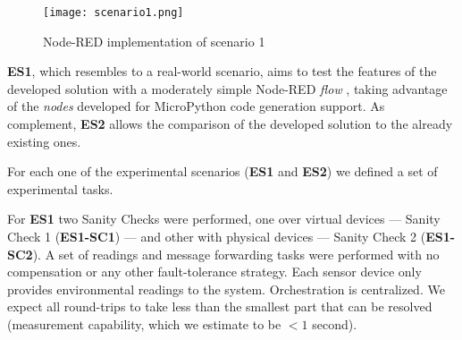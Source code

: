 \begin{figure}[h]
\centering
\texttt{[image: scenario1.png]}
\caption[Node-RED implementation of scenario 1]{Node-RED implementation of scenario 1}\label{fig:scenario1_node_red}
\end{figure}

\textbf{ES1}, which resembles to a real-world scenario, aims to test the features of the developed solution with a moderately simple Node-RED \textit{flow} , taking advantage of the \textit{nodes} developed for MicroPython code generation support. As complement, \textbf{ES2} allows the comparison of the developed solution to the already existing ones.

For each one of the experimental scenarios (\ie \textbf{ES1} and \textbf{ES2}) we defined a set of experimental tasks. 

For \textbf{ES1} two Sanity Checks were performed, one over virtual devices --- Sanity Check 1 (\textbf{ES1-SC1}) --- and other with physical devices --- Sanity Check 2 (\textbf{ES1-SC2}). A set of readings and message forwarding tasks were performed with no compensation or any other fault-tolerance strategy. Each sensor device only provides environmental readings to the system. Orchestration is centralized. We expect all round-trips to take less than the smallest part that can be resolved (measurement capability, which we estimate to be $<1$ second).


